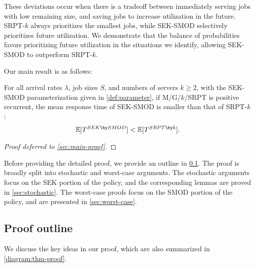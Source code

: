 \documentclass[acmsmall]{acmart}
\newcommand{\E}[1]{\mathbb{E}[#1]}
\begin{document}
These deviations occur when there is a tradeoff between immediately serving jobs with low remaining size, and saving jobs to increase utilization in the future. SRPT-$k$ always prioritizes the smallest jobs, while SEK-SMOD selectively prioritizes future utilization. We demonstrate that the balance of probabilities favors prioritizing future utilization in the situations we identify, allowing SEK-SMOD to outperform SRPT-$k$.

Our main result is as follows:

\begin{theorem}
    \label{thm:main}
    For all arrival rates $\lambda$, job sizes $S$, and numbers of servers $k\geq 2$,
    with the SEK-SMOD parameterization given in \cref{def:parameter},
    if M/G/$k$/SRPT is positive recurrent,
    the mean response time of SEK-SMOD is smaller than that of SRPT-$k$:
    \begin{align*}
        \E{T^{SEK \hy SMOD}} < \E{T^{SRPT \hy k}}. 
    \end{align*}
\end{theorem}
\begin{proof}[Proof deferred to \cref{sec:main-proof}]
\end{proof}


Before providing the detailed proof, we provide an outline in \cref{sec:proof-outline}. The proof is broadly split into stochastic and worst-case arguments. The stochastic arguments focus on the SEK portion of the policy, and the corresponding lemmas are proved in \cref{sec:stochastic}. The worst-case proofs focus on the SMOD portion of the policy, and are presented in \cref{sec:worst-case}.

\subsection{Proof outline}
\label{sec:proof-outline}


We discuss the key ideas in our proof, which are also summarized in \cref{diagram:thm-proof}.
\end{document}
